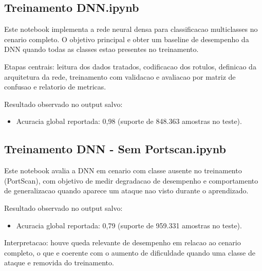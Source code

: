 
\subsection{Treinamento DNN.ipynb}

Este notebook implementa a rede neural densa para classificacao multiclasses no cenario completo. O objetivo principal e obter um baseline de desempenho da DNN quando todas as classes estao presentes no treinamento.

Etapas centrais: leitura dos dados tratados, codificacao dos rotulos, definicao da arquitetura da rede, treinamento com validacao e avaliacao por matriz de confusao e relatorio de metricas.

Resultado observado no output salvo:
\begin{itemize}
\item Acuracia global reportada: 0,98 (suporte de 848.363 amostras no teste).
\end{itemize}


\subsection{Treinamento DNN - Sem Portscan.ipynb}

Este notebook avalia a DNN em cenario com classe ausente no treinamento (PortScan), com objetivo de medir degradacao de desempenho e comportamento de generalizacao quando aparece um ataque nao visto durante o aprendizado.

Resultado observado no output salvo:
\begin{itemize}
\item Acuracia global reportada: 0,79 (suporte de 959.331 amostras no teste).
\end{itemize}

Interpretacao: houve queda relevante de desempenho em relacao ao cenario completo, o que e coerente com o aumento de dificuldade quando uma classe de ataque e removida do treinamento.



